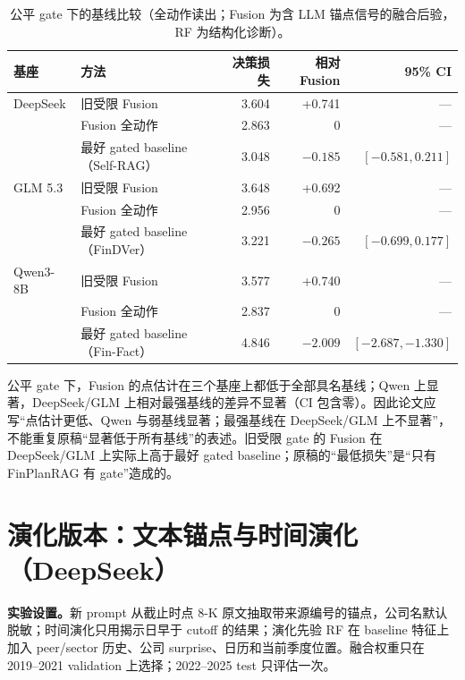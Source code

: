 \begin{table}[H]
\centering
{}
\setlength{\tabcolsep}{3pt}
\caption{公平 gate 下的基线比较（全动作读出；Fusion 为含 LLM 锚点信号的融合后验，RF 为结构化诊断）。}
\label{tab:fair}
\begin{tabular}{llrrr}
\toprule
基座 & 方法 & 决策损失 & 相对 Fusion & 95\% CI \\
\midrule
DeepSeek & 旧受限 Fusion & 3.604 & +0.741 & — \\
\rowcolor{yellow!18} & Fusion 全动作 & 2.863 & 0 & — \\
\rowcolor{yellow!18} & 最好 gated baseline（Self-RAG） & 3.048 & $-0.185$ & $[-0.581,0.211]$ \\
GLM 5.3 & 旧受限 Fusion & 3.648 & +0.692 & — \\
\rowcolor{yellow!18} & Fusion 全动作 & 2.956 & 0 & — \\
\rowcolor{yellow!18} & 最好 gated baseline（FinDVer） & 3.221 & $-0.265$ & $[-0.699,0.177]$ \\
Qwen3-8B & 旧受限 Fusion & 3.577 & +0.740 & — \\
\rowcolor{yellow!18} & Fusion 全动作 & 2.837 & 0 & — \\
\rowcolor{yellow!18} & 最好 gated baseline（Fin-Fact） & 4.846 & $-2.009$ & $[-2.687,-1.330]$ \\
\bottomrule
\end{tabular}
\end{table}

\begin{revbox}
\noindent 公平 gate 下，Fusion 的点估计在三个基座上都低于全部具名基线；Qwen 上显著，DeepSeek/GLM 上相对最强基线的差异不显著（CI 包含零）。因此论文应写“点估计更低、Qwen 与弱基线显著；最强基线在 DeepSeek/GLM 上不显著”，不能重复原稿“显著低于所有基线”的表述。旧受限 gate 的 Fusion 在 DeepSeek/GLM 上实际上高于最好 gated baseline；原稿的“最低损失”是“只有 FinPlanRAG 有 gate”造成的。
\end{revbox}

\section{演化版本：文本锚点与时间演化（DeepSeek）}

\begin{revbox}
\noindent\textbf{实验设置。}新 prompt 从截止时点 8-K 原文抽取带来源编号的锚点，公司名默认脱敏；时间演化只用揭示日早于 cutoff 的结果；演化先验 RF 在 baseline 特征上加入 peer/sector 历史、公司 surprise、日历和当前季度位置。融合权重只在 2019--2021 validation 上选择；2022--2025 test 只评估一次。
\end{revbox}

